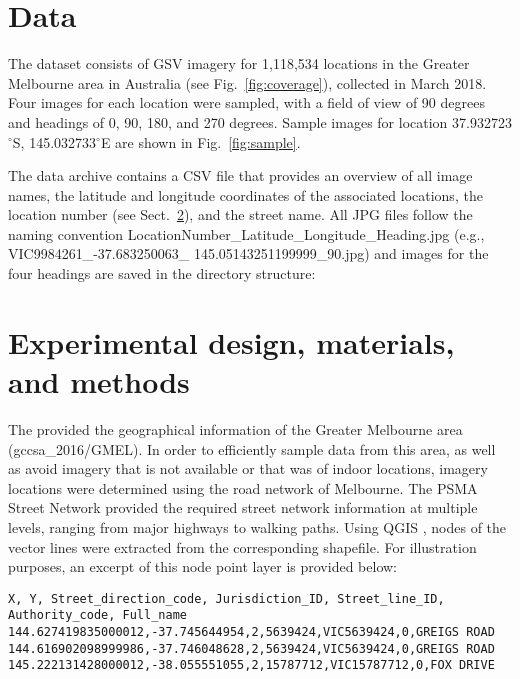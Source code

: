 \documentclass[final,3p,times,authoryear]{elsarticle}
\begin{document}
\section{Data}

The dataset consists of GSV imagery for 1,118,534 locations in the Greater Melbourne area in Australia (see Fig.~\ref{fig:coverage}), collected in March 2018. Four images for each location were sampled, with a field of view of 90 degrees and headings of 0, 90, 180, and 270 degrees. Sample images for location 37.932723$^\circ$S, 145.032733$^\circ$E are shown in Fig.~\ref{fig:sample}.



The data archive contains a CSV file that provides an overview of all image names, the latitude and longitude coordinates of the associated locations, the location number (see Sect.~\ref{sec:create}), and the street name. All JPG files follow the naming convention LocationNumber\_Latitude\_Longitude\_Heading.jpg (e.g., VIC9984261\_-37.683250063\_ 145.05143251199999\_90.jpg) and images for the four headings are saved in the directory structure:




\section{Experimental design, materials, and methods}
\label{sec:create}

The \citet{Aurin2018} provided the geographical information of the Greater Melbourne area (gccsa\_2016/GMEL). In order to efficiently sample data from this area, as well as avoid imagery that is not available or that was of indoor locations, imagery locations were determined using the road network of Melbourne. The PSMA Street Network \citep{PSMA2018} provided the required street network information at multiple levels, ranging from major highways to walking paths. Using QGIS \citep{QGIS2009}, nodes of the vector lines were extracted from the corresponding shapefile. For illustration purposes, an excerpt of this node point layer is provided below:

\begin{verbatim}
X, Y, Street_direction_code, Jurisdiction_ID, Street_line_ID, Authority_code, Full_name
144.627419835000012,-37.745644954,2,5639424,VIC5639424,0,GREIGS ROAD
144.616902098999986,-37.746048628,2,5639424,VIC5639424,0,GREIGS ROAD
145.222131428000012,-38.055551055,2,15787712,VIC15787712,0,FOX DRIVE
\end{verbatim}
\end{document}

